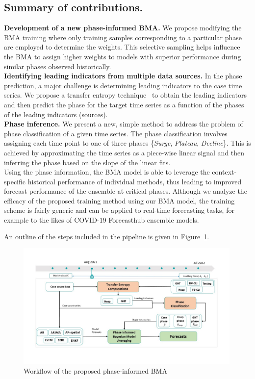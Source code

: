 \documentclass[conference,compsoc]{IEEEtran}
\begin{document}
\subsection{Summary of contributions.}
\noindent
\textbf{Development of a new phase-informed BMA.}
We propose modifying the BMA training where only training samples corresponding to a particular phase are employed to determine the weights. This selective sampling helps influence the BMA to assign higher weights to models with superior performance during similar phases observed historically. 
\\
\textbf{Identifying leading indicators from multiple data sources.}
In the phase prediction, a major challenge is determining leading indicators to the case time series. We propose a transfer entropy technique~\cite{schreiber2000measuring} to obtain the leading indicators and then predict the phase for the target time series as a function of the phases of the leading indicators (sources). 
\\
\textbf{Phase inference.}
We present a new, simple method to address the problem of phase classification of a given time series. The phase classification involves assigning each time point to one of three phases \{\emph{Surge}, \emph{Plateau}, \emph{Decline}\}. This is achieved by approximating the time series as a piece-wise linear signal and then inferring the phase based on the slope of the linear fits. 
\\
Using the phase information, the BMA model is able to leverage the context-specific historical performance of individual methods, thus leading to improved forecast performance of the ensemble at critical phases. 
Although we analyze the efficacy of the proposed training method using our BMA model, the training scheme is fairly generic and can be applied to real-time forecasting tasks, for example to the likes of COVID-19 Forecasthub ensemble models.


An outline of the steps included in the pipeline is given in Figure~\ref{fig:pipeline}.
\begin{figure}[!t]
    \centering
    \includegraphics[width=0.99\textwidth]{figs/flow-diagram.jpeg}
    \caption{Workflow of the proposed phase-informed BMA}
    \label{fig:pipeline}
\end{figure}
\end{document}
